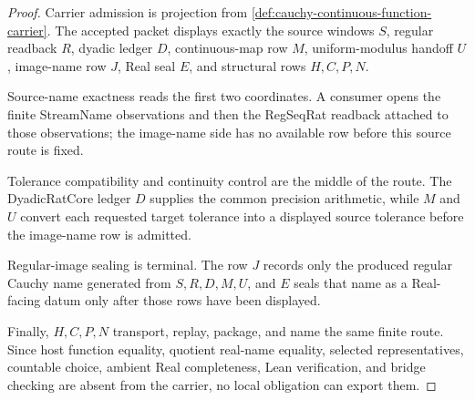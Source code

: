 \begin{proof}
Carrier admission is projection from \autoref{def:cauchy-continuous-function-carrier}. The accepted packet displays exactly the source windows $S$, regular readback $R$, dyadic ledger $D$, continuous-map row $M$, uniform-modulus handoff $U$, image-name row $J$, Real seal $E$, and structural rows $H,C,P,N$.

Source-name exactness reads the first two coordinates. A consumer opens the finite StreamName observations and then the RegSeqRat readback attached to those observations; the image-name side has no available row before this source route is fixed.

Tolerance compatibility and continuity control are the middle of the route. The DyadicRatCore ledger $D$ supplies the common precision arithmetic, while $M$ and $U$ convert each requested target tolerance into a displayed source tolerance before the image-name row is admitted.

Regular-image sealing is terminal. The row $J$ records only the produced regular Cauchy name generated from $S,R,D,M,U$, and $E$ seals that name as a Real-facing datum only after those rows have been displayed.

Finally, $H,C,P,N$ transport, replay, package, and name the same finite route. Since host function equality, quotient real-name equality, selected representatives, countable choice, ambient Real completeness, Lean verification, and bridge checking are absent from the carrier, no local obligation can export them.
\end{proof}




